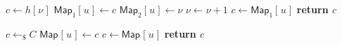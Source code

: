 \documentclass{iacrtrans}
\begin{document}
\begin{minipage}[t]{0.46\textwidth}
\begin{algorithm}[H]
    \centering
    \caption{$\mathcal{O}^{\mathsf{hash}}(u)$}\label{alg_hash_oracle}
    \begin{algorithmic}
        \vspace{2pt}
            \State
            	$c \leftarrow h[\hspace{1pt}\nu\hspace{1pt}]$\vspace{3pt}
        	\State
        		$\mathsf{Map}_1[\hspace{1pt}u\hspace{1pt}]
        		\leftarrow c$\vspace{3pt}
        		\State
        		$\mathsf{Map}_2[\hspace{1pt}u\hspace{1pt}]
        		\leftarrow \nu$\vspace{3pt}
        	\State
        		$\nu \leftarrow \nu + 1$\vspace{0pt}
        \Else
        	\State
        		$c \leftarrow \mathsf{Map}_1
        		[\hspace{1pt}u\hspace{1pt}]$\vspace{0pt}
        \EndIf
        \State \textbf{return $c$}
    \end{algorithmic}
\end{algorithm}
\vspace{0pt}
\end{minipage}
\hfill
\begin{minipage}[t]{0.46\textwidth}
\begin{algorithm}[H]
    \centering
    \caption{$H(u)$}\label{alg_random_oracle}
    \begin{algorithmic}
        \vspace{2pt}
        	\State
        		$c \leftarrow_\$ C$\vspace{4pt}
        	\State
        		$\mathsf{Map}\hspace{1pt}
        		[\hspace{1pt}u\hspace{1pt}] \leftarrow c$
        \Else
        	\State
        		$c \leftarrow \mathsf{Map}
        		\hspace{1pt}[\hspace{1pt}u\hspace{1pt}]$
        \EndIf
        \State \textbf{return $c$}
    \end{algorithmic}
\end{algorithm}
\vspace{0pt}
\end{minipage}
\end{document}
